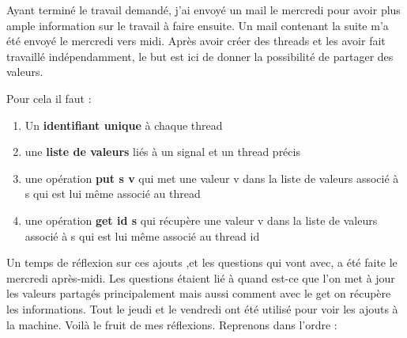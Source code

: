 \documentclass[10pt,a4paper]{article}
\begin{document}
		Ayant terminé le travail demandé, j'ai envoyé un mail le mercredi pour avoir plus ample information sur le travail à faire ensuite. Un mail contenant la suite m'a été envoyé le mercredi vers midi. Après avoir créer des threads et les avoir fait travaillé indépendamment, le but est ici de donner la possibilité de partager des valeurs.
		\smallbreak
		
		Pour cela il faut :
		\begin{enumerate}
			\item Un \textbf{identifiant unique} à chaque thread
			\item une \textbf{liste de valeurs} liés à un signal et un thread précis
			\item une opération \textbf{put s v} qui met une valeur v dans la liste de valeurs associé à s qui est lui même associé au thread 
			\item une opération \textbf{get id s} qui récupère une valeur v dans la liste de valeurs associé à s qui est lui même associé au thread id 
		\end{enumerate}
		Un temps de réflexion sur ces ajouts ,et les questions qui vont avec, a été faite le mercredi après-midi. Les questions étaient lié à quand est-ce que l'on met à jour les valeurs partagés principalement mais aussi comment avec le get on récupère les informations. 
		\newpage
		Tout le jeudi et le vendredi ont été utilisé pour voir les ajouts à la machine. Voilà le fruit de mes réflexions.
		Reprenons dans l'ordre :
\end{document}
